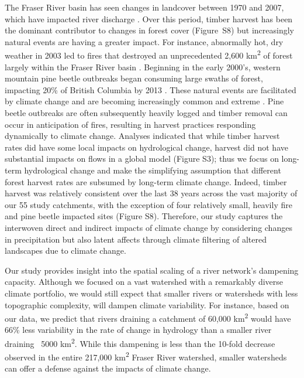 \documentclass[draft,linenumbers]{AGUJournal}
\begin{document}
The Fraser River basin has seen changes in landcover between 1970 and 2007, which have impacted river discharge \citep[e.g.,][]{Zhang:2014}. Over this period, timber harvest has been the dominant contributor to changes in forest cover (Figure~S8) but increasingly natural events are having a greater impact. For instance, abnormally hot, dry weather in 2003 led to fires that destroyed an unprecedented 2,600 km\textsuperscript{2} of forest largely within the Fraser River basin \citep{Filmon:2003}. Beginning in the early 2000's, western mountain pine beetle outbreaks began consuming large swaths of forest, impacting 20\% of British Columbia by 2013 \citep{schnorbus:2010}. These natural events are facilitated by climate change and are becoming increasingly common and extreme \citep{Melillo:2014, Maness:2013}. Pine beetle outbreaks are often subsequently heavily logged and timber removal can occur in anticipation of fires, resulting in harvest practices responding dynamically to climate change. Analyses indicated that while timber harvest rates did have some local impacts on hydrological change, harvest did not have substantial impacts on flows in a global model (Figure S3); thus we focus on long-term hydrological change and make the simplifying assumption that different forest harvest rates are subsumed by long-term climate change. Indeed, timber harvest was relatively consistent over the last 38 years across the vast majority of our 55 study catchments, with the exception of four relatively small, heavily fire and pine beetle impacted sites (Figure S8). Therefore, our study captures the interwoven direct and indirect impacts of climate change by considering changes in precipitation but also latent affects through climate filtering of altered landscapes due to climate change.

Our study provides insight into the spatial scaling of a river network's dampening capacity. Although we focused on a vast watershed with a remarkably diverse climate portfolio, we would still expect that smaller rivers or watersheds with less topographic complexity, will dampen climate variability. For instance, based on our data, we predict that rivers draining a catchment of 60,000 km\textsuperscript{2} would have 66\% less variability in the rate of change in hydrology than a smaller river draining ~5000 km\textsuperscript{2}. While this dampening is less than the 10-fold decrease observed in the entire 217,000 km\textsuperscript{2} Fraser River watershed, smaller watersheds can offer a defense against the impacts of climate change.
\end{document}
